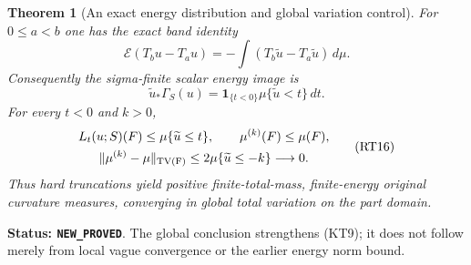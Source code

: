 \documentclass[11pt,a4paper]{article}
\numberwithin{equation}{section}
\newtheorem{theorem}{Theorem}[section]
\theoremstyle{definition}
\theoremstyle{remark}
\begin{document}
\begin{theorem}[An exact energy distribution and global variation control]
\label{thm:r11-positive-diffuse-global-variation}
For $0\le a<b$ one has the exact band identity
\[
 \mathcal E(T_bu-T_au)
       =-\int(T_b\widetilde u-T_a\widetilde u)\,d\mu.
 \tag{RT14}
\]
Consequently the sigma-finite scalar energy image is
\[
       \widetilde u_*\Gamma_S(u)
          =\mathbf1_{\{t<0\}}\mu\{\widetilde u<t\}\,dt.
 \tag{RT15}
\]
For every $t<0$ and $k>0$,
\[
 \begin{gathered}
     L_t(u;S)(F)\le\mu\{\widetilde u\le t\},\qquad
     \mu^{(k)}(F)\le\mu(F),\\
 \|\mu^{(k)}-\mu\|_{\rm TV(F)}
       \le2\mu\{\widetilde u\le-k\}\longrightarrow0.
 \end{gathered}
 \tag{RT16}
\]
Thus hard truncations yield positive finite-total-mass,
finite-energy original curvature measures, converging in
\emph{global} total variation on the part domain.
\end{theorem}

\noindent\textbf{Status: \texttt{NEW\_PROVED}}.  The global
conclusion strengthens (KT9); it does not follow merely from
local vague convergence or the earlier energy norm bound.
\end{document}
